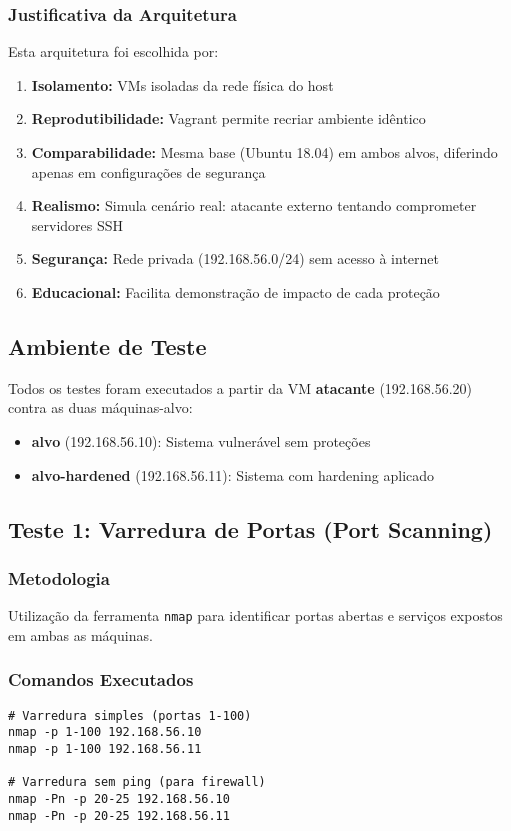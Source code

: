 \documentclass[12pt]{article}
\begin{document}
\subsubsection{Justificativa da Arquitetura}

Esta arquitetura foi escolhida por:
\begin{enumerate}
    \item \textbf{Isolamento:} VMs isoladas da rede física do host
    \item \textbf{Reprodutibilidade:} Vagrant permite recriar ambiente idêntico
    \item \textbf{Comparabilidade:} Mesma base (Ubuntu 18.04) em ambos alvos, diferindo apenas em configurações de segurança
    \item \textbf{Realismo:} Simula cenário real: atacante externo tentando comprometer servidores SSH
    \item \textbf{Segurança:} Rede privada (192.168.56.0/24) sem acesso à internet
    \item \textbf{Educacional:} Facilita demonstração de impacto de cada proteção
\end{enumerate}

\subsection{Ambiente de Teste}

Todos os testes foram executados a partir da VM \textbf{atacante} (192.168.56.20) contra as duas máquinas-alvo:
\begin{itemize}
    \item \textbf{alvo} (192.168.56.10): Sistema vulnerável sem proteções
    \item \textbf{alvo-hardened} (192.168.56.11): Sistema com hardening aplicado
\end{itemize}

\subsection{Teste 1: Varredura de Portas (Port Scanning)}

\subsubsection{Metodologia}
Utilização da ferramenta \texttt{nmap} para identificar portas abertas e serviços expostos em ambas as máquinas.

\subsubsection{Comandos Executados}
\begin{verbatim}
# Varredura simples (portas 1-100)
nmap -p 1-100 192.168.56.10
nmap -p 1-100 192.168.56.11

# Varredura sem ping (para firewall)
nmap -Pn -p 20-25 192.168.56.10
nmap -Pn -p 20-25 192.168.56.11
\end{verbatim}
\end{document}
